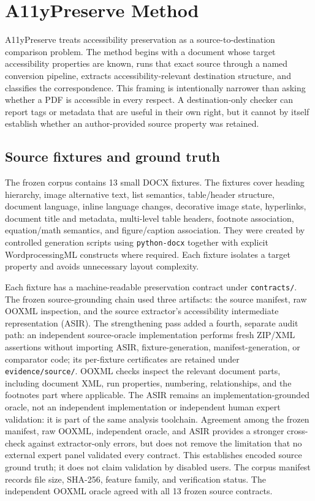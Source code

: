 \section{A11yPreserve Method}
\label{sec:method}

A11yPreserve treats accessibility preservation as a source-to-destination comparison problem. The method begins with a document whose target accessibility properties are known, runs that exact source through a named conversion pipeline, extracts accessibility-relevant destination structure, and classifies the correspondence. This framing is intentionally narrower than asking whether a PDF is accessible in every respect. A destination-only checker can report tags or metadata that are useful in their own right, but it cannot by itself establish whether an author-provided source property was retained.

\subsection{Source fixtures and ground truth}

The frozen corpus contains 13 small DOCX fixtures. The fixtures cover heading hierarchy, image alternative text, list semantics, table/header structure, document language, inline language changes, decorative image state, hyperlinks, document title and metadata, multi-level table headers, footnote association, equation/math semantics, and figure/caption association. They were created by controlled generation scripts using \texttt{python-docx} together with explicit WordprocessingML constructs where required. Each fixture isolates a target property and avoids unnecessary layout complexity.

Each fixture has a machine-readable preservation contract under \texttt{contracts/}. The frozen source-grounding chain used three artifacts: the source manifest, raw OOXML inspection, and the source extractor's accessibility intermediate representation (ASIR). The strengthening pass added a fourth, separate audit path: an independent source-oracle implementation performs fresh ZIP/XML assertions without importing ASIR, fixture-generation, manifest-generation, or comparator code; its per-fixture certificates are retained under \texttt{evidence/source/}. OOXML checks inspect the relevant document parts, including document XML, run properties, numbering, relationships, and the footnotes part where applicable. The ASIR remains an implementation-grounded oracle, not an independent implementation or independent human expert validation: it is part of the same analysis toolchain. Agreement among the frozen manifest, raw OOXML, independent oracle, and ASIR provides a stronger cross-check against extractor-only errors, but does not remove the limitation that no external expert panel validated every contract. This establishes encoded source ground truth; it does not claim validation by disabled users. The corpus manifest records file size, SHA-256, feature family, and verification status.
The independent OOXML oracle agreed with all 13 frozen source contracts.

